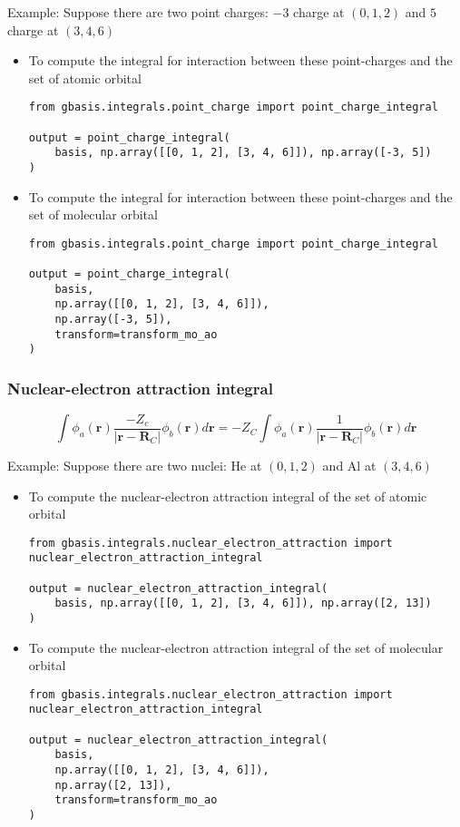 \documentclass[letterpaper]{article}
\begin{document}
Example:
Suppose there are two point charges: $-3$ charge at $(0, 1, 2)$ and $5$ charge
at $(3, 4, 6)$
\begin{itemize}
\item To compute the integral for interaction between these point-charges and
  the set of atomic orbital
  \begin{lstlisting}[xleftmargin=-25pt]
from gbasis.integrals.point_charge import point_charge_integral

output = point_charge_integral(
    basis, np.array([[0, 1, 2], [3, 4, 6]]), np.array([-3, 5])
)
\end{lstlisting}
\item To compute the integral for interaction between these point-charges and
  the set of molecular orbital
  \begin{lstlisting}[xleftmargin=-25pt]
from gbasis.integrals.point_charge import point_charge_integral

output = point_charge_integral(
    basis,
    np.array([[0, 1, 2], [3, 4, 6]]),
    np.array([-3, 5]),
    transform=transform_mo_ao
)
\end{lstlisting}
\end{itemize}
\subsubsection{Nuclear-electron attraction integral}
\begin{equation}
  \label{eq:nuclear_electron_attraction}
  \int \phi_a(\mathbf{r}) \frac{-Z_c}{|\mathbf{r} - \mathbf{R}_C|} \phi_b(\mathbf{r}) d\mathbf{r}
  =
  -Z_C \int \phi_a(\mathbf{r}) \frac{1}{|\mathbf{r} - \mathbf{R}_C|} \phi_b(\mathbf{r}) d\mathbf{r}
\end{equation}

Example:
Suppose there are two nuclei: He at $(0, 1, 2)$ and Al at $(3, 4, 6)$
\begin{itemize}
\item To compute the nuclear-electron attraction integral of the set of atomic
  orbital
  \begin{lstlisting}[xleftmargin=-25pt]
from gbasis.integrals.nuclear_electron_attraction import nuclear_electron_attraction_integral

output = nuclear_electron_attraction_integral(
    basis, np.array([[0, 1, 2], [3, 4, 6]]), np.array([2, 13])
)
\end{lstlisting}
\item To compute the nuclear-electron attraction integral of the set of molecular
  orbital
  \begin{lstlisting}[xleftmargin=-25pt]
from gbasis.integrals.nuclear_electron_attraction import nuclear_electron_attraction_integral

output = nuclear_electron_attraction_integral(
    basis,
    np.array([[0, 1, 2], [3, 4, 6]]),
    np.array([2, 13]),
    transform=transform_mo_ao
)
\end{lstlisting}
\end{itemize}
\end{document}
